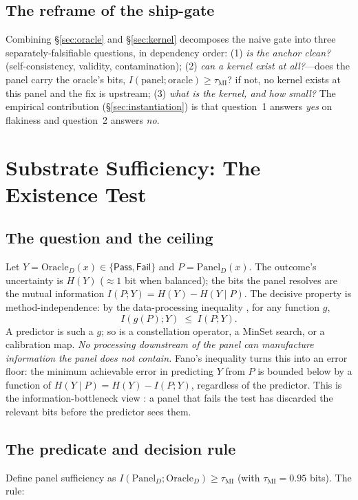 \documentclass[10pt,twocolumn]{article}
\begin{document}
\subsection{The reframe of the ship-gate}
Combining \S\ref{sec:oracle} and \S\ref{sec:kernel} decomposes the naive gate into
three separately-falsifiable questions, in dependency order: (1) \emph{is the
anchor clean?} (self-consistency, validity, contamination); (2) \emph{can a kernel
exist at all?}---does the panel carry the oracle's bits,
$I(\text{panel};\text{oracle})\ge\tau_{\mathrm{MI}}$? if not, no kernel exists at
this panel and the fix is upstream; (3) \emph{what is the kernel, and how small?}
The empirical contribution (\S\ref{sec:instantiation}) is that question~1 answers
\emph{yes} on flakiness and question~2 answers \emph{no}.

\section{Substrate Sufficiency: The Existence Test}
\label{sec:substrate}

\subsection{The question and the ceiling}
Let $Y=\mathrm{Oracle}_D(x)\in\{\textsf{Pass},\textsf{Fail}\}$ and
$P=\mathrm{Panel}_D(x)$. The outcome's uncertainty is $H(Y)$ ($\approx1$ bit when
balanced); the bits the panel resolves are the mutual information
$I(P;Y)=H(Y)-H(Y\mid P)$. The decisive property is method-independence: by the
data-processing inequality \citep{cover2006elements}, for any function $g$,
\begin{equation}
I(g(P);Y)\;\le\;I(P;Y).
\end{equation}
A predictor is such a $g$; so is a constellation operator, a MinSet search, or a
calibration map. \emph{No processing downstream of the panel can manufacture
information the panel does not contain.} Fano's inequality
\citep{fano1961transmission, cover2006elements} turns this into an error floor:
the minimum achievable error in predicting $Y$ from $P$ is bounded below by a
function of $H(Y\mid P)=H(Y)-I(P;Y)$, regardless of the predictor. This is the
information-bottleneck view \citep{tishby1999information}: a panel that fails the
test has discarded the relevant bits before the predictor sees them.

\subsection{The predicate and decision rule}
Define panel sufficiency as $I(\mathrm{Panel}_D;\mathrm{Oracle}_D)\ge
\tau_{\mathrm{MI}}$ (with $\tau_{\mathrm{MI}}=0.95$ bits). The rule:
\end{document}
